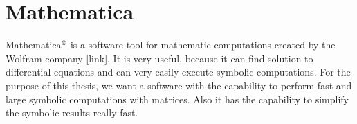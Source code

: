 \section{Mathematica}
Mathematica$^{\textrm{\copyright}}$ is a software tool for mathematic computations created by the Wolfram company [link]. It is very useful, because it can find solution to differential equations and can very easily execute symbolic computations. For the purpose of this thesis, we want a software with the capability to perform fast and large symbolic computations with matrices. Also it has the capability to simplify the symbolic results really fast. 